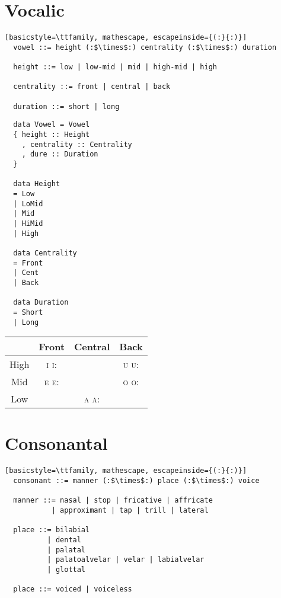 \documentclass{report}
\begin{document}
\section{Vocalic}

\begin{lstlisting}[basicstyle=\ttfamily, mathescape, escapeinside={(:}{:)}]
  vowel ::= height (:$\times$:) centrality (:$\times$:) duration

  height ::= low | low-mid | mid | high-mid | high

  centrality ::= front | central | back

  duration ::= short | long
\end{lstlisting}

\begin{verbatim}
  data Vowel = Vowel
  { height :: Height
    , centrality :: Centrality
    , dure :: Duration
  }

  data Height
  = Low
  | LoMid
  | Mid
  | HiMid
  | High

  data Centrality
  = Front
  | Cent
  | Back

  data Duration
  = Short
  | Long
\end{verbatim}

\begin{tabular}{|c|c|c|c|}
  \hline
  & Front & Central & Back \\
  \hline
  High & \textsc{i i:} & & \textsc{u u:} \\
  \hline
  Mid & \textsc{e e:} & & \textsc{o o:} \\
  \hline
  Low & & \textsc{a a:} & \\
  \hline
\end{tabular}

\section{Consonantal}

\begin{lstlisting}[basicstyle=\ttfamily, mathescape, escapeinside={(:}{:)}]
  consonant ::= manner (:$\times$:) place (:$\times$:) voice

  manner ::= nasal | stop | fricative | affricate
           | approximant | tap | trill | lateral

  place ::= bilabial
          | dental
          | palatal
          | palatoalvelar | velar | labialvelar
          | glottal

  place ::= voiced | voiceless
\end{lstlisting}
\end{document}
